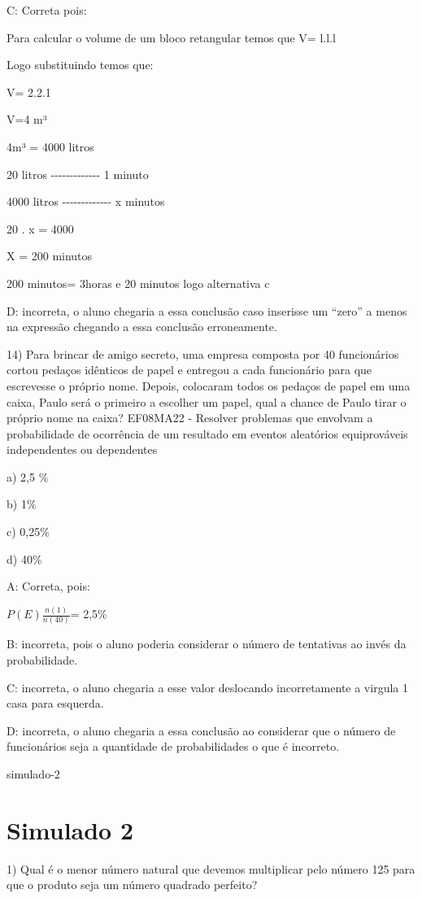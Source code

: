 {C: Correta pois:

Para calcular o volume de um bloco retangular temos que V= l.l.l

Logo substituindo temos que:

V= 2.2.1

V=4 m³

4m³ = 4000 litros

20 litros -\/-\/-\/-\/-\/-\/-\/-\/-\/-\/-\/-\/- 1 minuto

4000 litros -\/-\/-\/-\/-\/-\/-\/-\/-\/-\/-\/-\/- x minutos

20 . x = 4000

X = 200 minutos

200 minutos= 3horas e 20 minutos logo alternativa c

D: incorreta, o aluno chegaria a essa conclusão caso inserisse um
``zero'' a menos na expressão chegando a essa conclusão erroneamente.

14) Para brincar de amigo secreto, uma empresa composta por 40
funcionários cortou pedaços idênticos de papel e entregou a cada
funcionário para que escrevesse o próprio nome. Depois, colocaram todos
os pedaços de papel em uma caixa, Paulo será o primeiro a escolher um
papel, qual a chance de Paulo tirar o próprio nome na caixa? EF08MA22 -
Resolver problemas que envolvam a probabilidade de ocorrência de um
resultado em eventos aleatórios equiprováveis independentes ou
dependentes

a) 2,5 \%

b) 1\%

c) 0,25\%

d) 40\%

A: Correta, pois:

\(P(E)\frac{n(1)}{n(40)}\)= 2,5\%

B: incorreta, pois o aluno poderia considerar o número de tentativas ao
invés da probabilidade.

C: incorreta, o aluno chegaria a esse valor deslocando incorretamente a
virgula 1 casa para esquerda.

D: incorreta, o aluno chegaria a essa conclusão ao considerar que o
número de funcionários seja a quantidade de probabilidades o que é
incorreto.

simulado-2}{%
\section{Simulado 2}

1) Qual é o menor número natural que devemos multiplicar pelo número 125
para que o produto seja um número quadrado perfeito?

}

